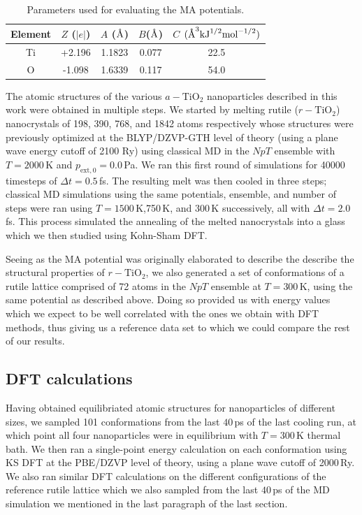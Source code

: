 \documentclass[aps,prb,twocolumn,amsmath,amssymb,superscriptaddress,longbibliography]{revtex4-1}
\newcommand{\angstrom}{\text{\normalfont\AA}}
\newcommand\tab[1][1cm]{\hspace*{#1}} %
\begin{document}
\begin{table}[]
\centering
\caption{Parameters used for evaluating the MA potentials.}
\label{classpot}
\
\begin{tabular}{ccccc}
\hline
Element & $Z$ ($|e|$) & $A$ ($\angstrom$) & $B$($\angstrom$) & $C$ $(\angstrom^3\text{kJ}^{1/2}\text{mol}^{-1/2})$ \\ \hline
Ti      & +2.196      & 1.1823            & 0.077            & 22.5                                                \\
O       & -1.098      & 1.6339            & 0.117            & 54.0                                                \\ \hline
\end{tabular}
\end{table}

\tab The atomic structures of the various $a-\text{TiO}_2$ nanoparticles described in this work were obtained in multiple steps.
We started by melting rutile ($r-\text{TiO}_2$) nanocrystals of 198, 390, 768, and 1842 atoms respectively whose structures were previously optimized at the BLYP/DZVP-GTH level of theory (using a plane wave energy cutoff of 2100 Ry) using classical MD in the $NpT$ ensemble with $T = 2000\,$K and $p_{\text{ext},0} = 0.0\,$Pa. 
We ran this first round of simulations for 40000 timesteps of $\Delta t = 0.5\,$fs.
The resulting melt was then cooled in three steps; classical MD simulations using the same potentials, ensemble, and number of steps were ran using $T = 1500\,$K,750$\,$K, and 300$\,$K successively, all with $\Delta t = 2.0\,$fs.
This process simulated the annealing of the melted nanocrystals into a glass which we then studied using Kohn-Sham DFT.

\tab Seeing as the MA potential was originally elaborated to describe the describe the structural properties of $r-\text{TiO}_2$, we also generated a set of conformations of a rutile lattice comprised of 72 atoms in the $NpT$ ensemble at $T = 300\,\text{K}$, using the same potential as described above.
Doing so provided us with energy values which we expect to be well correlated with the ones we obtain with DFT methods, thus giving us a reference data set to which we could compare the rest of our results.

\subsection{DFT calculations}

\tab Having obtained equilibriated atomic structures for nanoparticles of different sizes, we sampled 101 conformations from the last $40\,$ps of the last cooling run, at which point all four nanoparticles were in equilibrium with $T = 300\,\text{K}$ thermal bath.
We then ran a single-point energy calculation on each conformation using KS DFT at the PBE/DZVP level of theory, using a plane wave cutoff of 2000$\,$Ry.
We also ran similar DFT calculations on the different configurations of the reference rutile lattice which we also sampled from the last $40\,$ps of the MD simulation we mentioned in the last paragraph of the last section.
\end{document}

